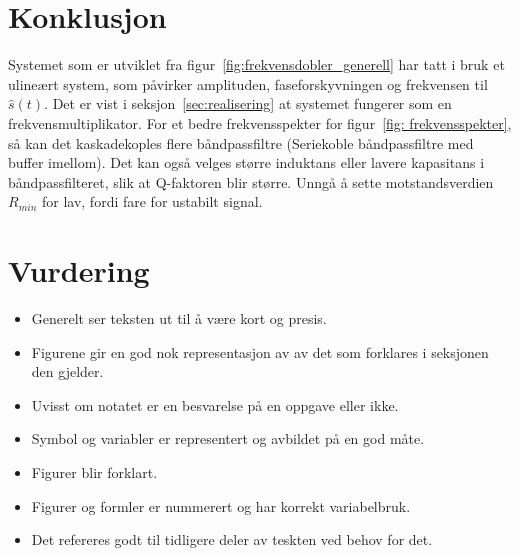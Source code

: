 \documentclass[a4paper,11pt,norsk]{article}
\begin{document}
\newpage
\section{Konklusjon}
\label{sec:konklusjon}
Systemet som er utviklet fra figur~\ref{fig:frekvensdobler_generell} har tatt i bruk et ulineært system, som påvirker amplituden, faseforskyvningen og frekvensen til $\hat{s}(t)$. Det er vist i seksjon~\ref{sec:realisering} at systemet fungerer som en frekvensmultiplikator. For et bedre frekvensspekter for figur~\ref{fig: frekvensspekter}, så kan det kaskadekoples flere båndpassfiltre (Seriekoble båndpassfiltre med buffer imellom).
Det kan også velges større induktans eller lavere kapasitans i båndpassfilteret, slik at Q-faktoren blir større. Unngå å sette motstandsverdien $R_{min}$ for lav, fordi fare for ustabilt signal.
\newpage




\appendix 
\section{Vurdering}
\begin{itemize}
\item Generelt ser teksten ut til å være kort og presis.
\item Figurene gir en god nok representasjon av av det som forklares i seksjonen den gjelder.
\item Uvisst om notatet er en besvarelse på en oppgave eller ikke.
\item Symbol og variabler er representert og avbildet på en god måte.
\item Figurer blir forklart.
\item Figurer og formler er nummerert og har korrekt variabelbruk.
\item Det refereres godt til tidligere deler av teskten ved behov for det.
\end{itemize}
\end{document}
